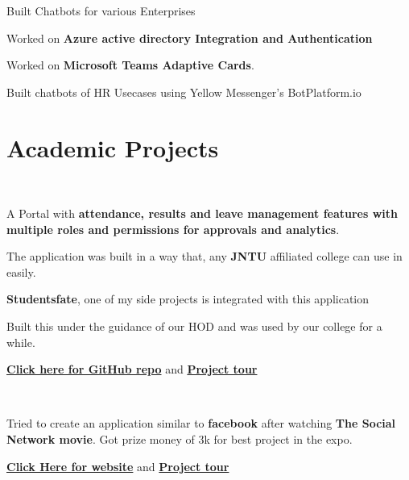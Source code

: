 \documentclass[]{deedy-resume-openfont}
\begin{document}
\begin{minipage}[t]{0.66\textwidth}
\descript{  }
\begin{tightemize}
\item Built Chatbots for various Enterprises
\item Worked on \textbf{Azure active directory Integration and Authentication}
\item Worked on \textbf{Microsoft Teams Adaptive Cards}.
\end{tightemize}

\begin{tightemize}
\item Built chatbots of HR Usecases using Yellow Messenger's BotPlatform.io
\end{tightemize}
\sectionsep


\section{Academic Projects}
\\
\begin{tightemize}
\item A Portal with \textbf{attendance, results and leave management features with multiple roles and permissions for approvals and analytics}.
\item The application was built in a way that, any \textbf{JNTU} affiliated college can use in easily. 
\item \textbf{Studentsfate}, one of my side projects is integrated with this application
\item Built this under the guidance of our HOD and was used by our college for a while.
\item \textbf{\href{https://github.com/Prathap-Chandra/VIMS02/}{Click here for GitHub repo}} and \textbf{\href{https://www.youtube.com/watch?v=SD9KdLAw1OI}{Project tour}}
\end{tightemize}
\sectionsep

\\
\begin{tightemize}
\item Tried to create an application similar to \textbf{facebook} after watching \textbf{The Social Network movie}. Got prize money of 3k for best project in the expo. 
\item \textbf{\href{http://vignanhub.phpnet.us/}{Click Here for website}} and \textbf{\href{https://www.youtube.com/watch?v=SD9KdLAw1OI}{Project tour}}
\end{tightemize}
\sectionsep
\nocite{*}

\end{minipage} 
\end{document}
